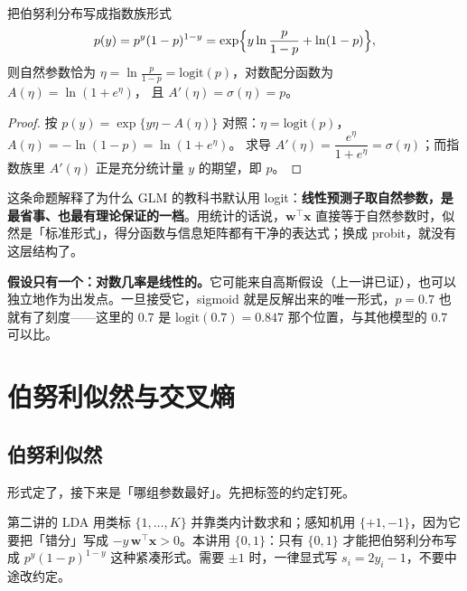 \documentclass[11pt,a4paper,fontset=windows,zihao=-4]{ctexart}
\newcommand{\bw}{\mathbf{w}}
\newcommand{\bx}{\mathbf{x}}
\newcommand{\tp}{^{\top}}
\begin{document}
\begin{prop}
把伯努利分布写成指数族形式
\begin{equation}
  p(y)=p^{y}(1-p)^{1-y}=\exp\Bigl\{y\ln\frac{p}{1-p}+\ln(1-p)\Bigr\},
\end{equation}
则自然参数恰为 $\eta=\ln\frac{p}{1-p}=\mathrm{logit}(p)$，对数配分函数为 $A(\eta)=\ln(1+e^{\eta})$，
且 $A'(\eta)=\sigma(\eta)=p$。
\end{prop}

\begin{proof}
按 $p(y)=\exp\{y\eta-A(\eta)\}$ 对照：$\eta=\mathrm{logit}(p)$，$A(\eta)=-\ln(1-p)=\ln(1+e^{\eta})$。
求导 $A'(\eta)=\dfrac{e^{\eta}}{1+e^{\eta}}=\sigma(\eta)$；而指数族里 $A'(\eta)$ 正是充分统计量 $y$ 的期望，即 $p$。
\end{proof}

这条命题解释了为什么 GLM 的教科书默认用 logit：\textbf{线性预测子取自然参数，是最省事、也最有理论保证的一档}。用统计的话说，$\bw\tp\bx$ 直接等于自然参数时，似然是「标准形式」，得分函数与信息矩阵都有干净的表达式；换成 probit，就没有这层结构了。

\begin{keybox}[本节结论]
\textbf{假设只有一个：对数几率是线性的。}它可能来自高斯假设（上一讲已证），也可以独立地作为出发点。一旦接受它，sigmoid 就是反解出来的唯一形式，$p=0.7$ 也就有了刻度——这里的 $0.7$ 是 $\mathrm{logit}(0.7)=0.847$ 那个位置，与其他模型的 $0.7$ 可以比。
\end{keybox}


\section{伯努利似然与交叉熵}

\subsection{伯努利似然}

形式定了，接下来是「哪组参数最好」。先把标签的约定钉死。

\begin{warn}[三套标签不能混]
第二讲的 LDA 用类标 $\{1,\dots,K\}$ 并靠类内计数求和；感知机用 $\{+1,-1\}$，因为它要把「错分」写成 $-y\,\bw\tp\bx>0$。本讲用 $\{0,1\}$：只有 $\{0,1\}$ 才能把伯努利分布写成 $p^{y}(1-p)^{1-y}$ 这种紧凑形式。需要 $\pm1$ 时，一律显式写 $s_i=2y_i-1$，不要中途改约定。
\end{warn}
\end{document}
